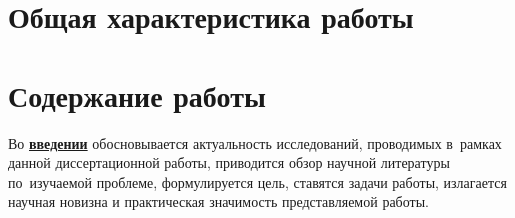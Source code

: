 \section*{Общая характеристика работы}

\newcommand{\actuality}{\pdfbookmark[1]{Актуальность}{actuality}\underline{\textbf{\actualityTXT}}}
\newcommand{\progress}{\pdfbookmark[1]{Разработанность темы}{progress}\underline{\textbf{\progressTXT}}}
\newcommand{\aim}{\pdfbookmark[1]{Цели}{aim}\underline{{\textbf\aimTXT}}}
\newcommand{\tasks}{\pdfbookmark[1]{Задачи}{tasks}\underline{\textbf{\tasksTXT}}}
\newcommand{\aimtasks}{\pdfbookmark[1]{Цели и задачи}{aimtasks}\aimtasksTXT}
\newcommand{\novelty}{\pdfbookmark[1]{Научная новизна}{novelty}\underline{\textbf{\noveltyTXT}}}
\newcommand{\influence}{\pdfbookmark[1]{Практическая значимость}{influence}\underline{\textbf{\influenceTXT}}}
\newcommand{\methods}{\pdfbookmark[1]{Методология и методы исследования}{methods}\underline{\textbf{\methodsTXT}}}
\newcommand{\defpositions}{\pdfbookmark[1]{Положения, выносимые на защиту}{defpositions}\underline{\textbf{\defpositionsTXT}}}
\newcommand{\reliability}{\pdfbookmark[1]{Достоверность}{reliability}\underline{\textbf{\reliabilityTXT}}}
\newcommand{\probation}{\pdfbookmark[1]{Апробация}{probation}\underline{\textbf{\probationTXT}}}
\newcommand{\contribution}{\pdfbookmark[1]{Личный вклад}{contribution}\underline{\textbf{\contributionTXT}}}
\newcommand{\publications}{\pdfbookmark[1]{Публикации}{publications}\underline{\textbf{\publicationsTXT}}}

\newcommand{\realisation}{\underline{\textbf{\realisationTXT}}}




\section*{Содержание работы}
Во \underline{\textbf{введении}} обосновывается актуальность
исследований, проводимых в~рамках данной диссертационной работы,
приводится обзор научной литературы по~изучаемой проблеме,
формулируется цель, ставятся задачи работы, излагается научная новизна
и практическая значимость представляемой работы.


